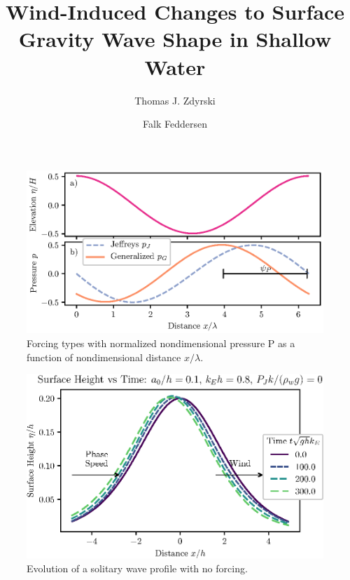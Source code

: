 \documentclass{jfm}
\title{Wind-Induced Changes to Surface Gravity Wave Shape in Shallow Water}
\author{Thomas J. Zdyrski \and Falk Feddersen}
\begin{document}
\begin{figure}
  \centering
  \includegraphics{Forcing-Types.eps}
  \caption{
    Forcing types with normalized nondimensional pressure P as a
    function of nondimensional distance $x/\lambda$.
  }
\end{figure}

\begin{figure}
  \centering
  \includegraphics{Long-Run.eps}
  \caption{
    Evolution of a solitary wave profile with no forcing.
  }
\end{figure}
\end{document}
